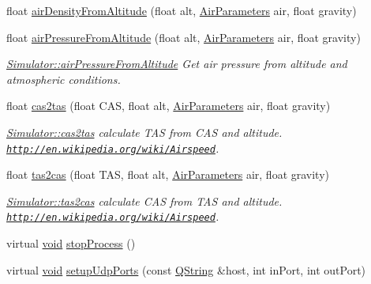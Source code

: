 \begin{DoxyCompactItemize}
float \hyperlink{group___h_i_t_l_plugin_ga20d3be9c0283514b5e2ca35280a86665}{air\-Density\-From\-Altitude} (float alt, \hyperlink{struct_air_parameters}{\-Air\-Parameters} air, float gravity)
\item 
float \hyperlink{group___h_i_t_l_plugin_gab5a7232560191dad8ff19517ed4a327a}{air\-Pressure\-From\-Altitude} (float alt, \hyperlink{struct_air_parameters}{\-Air\-Parameters} air, float gravity)
\begin{DoxyCompactList}\small\item\em \hyperlink{group___h_i_t_l_plugin_gab5a7232560191dad8ff19517ed4a327a}{\-Simulator\-::air\-Pressure\-From\-Altitude} \-Get air pressure from altitude and atmospheric conditions. \end{DoxyCompactList}\item 
float \hyperlink{group___h_i_t_l_plugin_ga86d7635f63f32cf0ef08e21a7e2874ea}{cas2tas} (float \-C\-A\-S, float alt, \hyperlink{struct_air_parameters}{\-Air\-Parameters} air, float gravity)
\begin{DoxyCompactList}\small\item\em \hyperlink{group___h_i_t_l_plugin_ga86d7635f63f32cf0ef08e21a7e2874ea}{\-Simulator\-::cas2tas} calculate \-T\-A\-S from \-C\-A\-S and altitude. \href{http://en.wikipedia.org/wiki/Airspeed}{\tt http\-://en.\-wikipedia.\-org/wiki/\-Airspeed}. \end{DoxyCompactList}\item 
float \hyperlink{group___h_i_t_l_plugin_gaf6d17454fad82383037d44ed3cb93a12}{tas2cas} (float \-T\-A\-S, float alt, \hyperlink{struct_air_parameters}{\-Air\-Parameters} air, float gravity)
\begin{DoxyCompactList}\small\item\em \hyperlink{group___h_i_t_l_plugin_gaf6d17454fad82383037d44ed3cb93a12}{\-Simulator\-::tas2cas} calculate \-C\-A\-S from \-T\-A\-S and altitude. \href{http://en.wikipedia.org/wiki/Airspeed}{\tt http\-://en.\-wikipedia.\-org/wiki/\-Airspeed}. \end{DoxyCompactList}\item 
virtual \hyperlink{group___u_a_v_objects_plugin_ga444cf2ff3f0ecbe028adce838d373f5c}{void} \hyperlink{group___h_i_t_l_plugin_ga12b351ec9ec8410a28d4f0f3d04ef9b6}{stop\-Process} ()
\item 
virtual \hyperlink{group___u_a_v_objects_plugin_ga444cf2ff3f0ecbe028adce838d373f5c}{void} \hyperlink{group___h_i_t_l_plugin_ga106e46211d3a00bd4a7b3b3918b23f63}{setup\-Udp\-Ports} (const \hyperlink{group___u_a_v_objects_plugin_gab9d252f49c333c94a72f97ce3105a32d}{\-Q\-String} \&host, int in\-Port, int out\-Port)

\end{DoxyCompactItemize}
